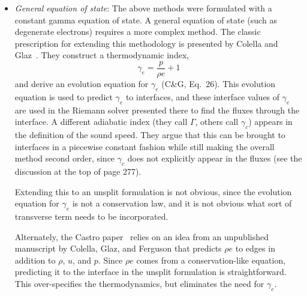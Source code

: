 \begin{itemize}
\item {\em General equation of state}: The above methods were formulated
with a constant gamma equation of state.  A general equation of state
(such as degenerate electrons) requires a more complex method.  The classic
prescription for extending this methodology is presented by Colella and 
Glaz~\cite{colellaglaz:1985}.  They construct a thermodynamic index,
\begin{equation}
\gamma_e = \frac{p}{\rho e} + 1
\end{equation}
and derive an evolution equation for $\gamma_e$ (C\&G, Eq.\ 26).  This
evolution equation is used to predict $\gamma_e$ to interfaces, and
these interface values of $\gamma_e$ are used in the Riemann solver 
presented there to find the fluxes through the interface.  A different
adiabatic index (they call $\Gamma$, others call $\gamma_c$) appears in
the definition of the sound speed.  They argue that this can be brought
to interfaces in a piecewise constant fashion while still making the
overall method second order, since $\gamma_c$ does not explicitly
appear in the fluxes (see the discussion at the top of page 277).

Extending this to an unsplit formulation is not obvious, since the
evolution equation for $\gamma_e$ is not a conservation law, and it
is not obvious what sort of transverse term needs to be incorporated.

Alternately, the Castro paper~\cite{almgren:2010} relies on an idea
from an unpublished manuscript by Colella, Glaz, and Ferguson that
predicts $\rho e$ to edges in addition to $\rho$, $u$, and $p$.  Since
$\rho e$ comes from a conservation-like equation, predicting it to the
interface in the unsplit formulation is straightforward.  This
over-specifies the thermodynamics, but eliminates the need for
$\gamma_e$.


\end{itemize}
